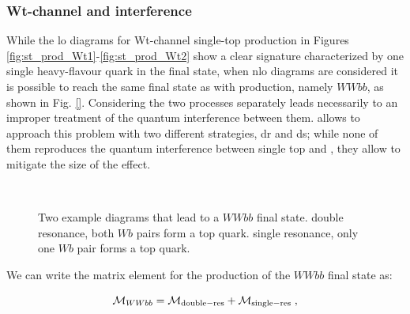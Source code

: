 \subsubsection*{Wt-channel and \ttbar interference}

While the \gls{lo} diagrams for Wt-channel single-top production in Figures \ref{fig:st_prod_Wt1}-\ref{fig:st_prod_Wt2} show a clear signature characterized by one single heavy-flavour quark in the final state,
when \gls{nlo} diagrams are considered it is possible to reach the same final state as with \ttbar production, namely $WWbb$, as shown in Fig. \ref{}. 
Considering the two processes separately leads necessarily to an improper treatment of the quantum interference between them.
\PowhegBox allows to approach this problem with two different strategies, \gls{dr} and \gls{ds}; while none of them reproduces the quantum interference between single top and \ttbar, they allow to mitigate the size of the effect. 

\begin{figure}[h]
\centering 
{}$\;\;\;\;\;\;$
\caption{Two example diagrams that lead to a $WWbb$ final state.  double resonance, both $Wb$ pairs form a top quark.  single resonance, only one $Wb$ pair forms a top quark.}\label{fig:WWbb}
\end{figure}


We can write the matrix element for the production of the $WWbb$ final state as:

\begin{equation}
\mathcal{M}_{WWbb} = \mathcal{M}_{\rm{double-res}} + \mathcal{M}_{\rm{single-res}} \; ,
\end{equation}


